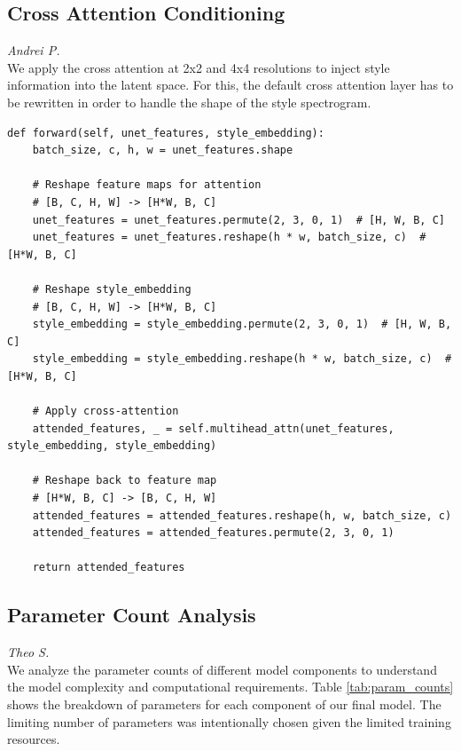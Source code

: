 \subsection{Cross Attention Conditioning}
\textit{Andrei P.}\\
We apply the cross attention at 2x2 and 4x4 resolutions to inject style information into the latent space. For this, the default cross attention layer has to be rewritten in order to handle the shape of the style spectrogram.
\begin{lstlisting}[basicstyle=\tiny]
def forward(self, unet_features, style_embedding):
    batch_size, c, h, w = unet_features.shape

    # Reshape feature maps for attention
    # [B, C, H, W] -> [H*W, B, C]
    unet_features = unet_features.permute(2, 3, 0, 1)  # [H, W, B, C]
    unet_features = unet_features.reshape(h * w, batch_size, c)  # [H*W, B, C]
    
    # Reshape style_embedding
    # [B, C, H, W] -> [H*W, B, C]
    style_embedding = style_embedding.permute(2, 3, 0, 1)  # [H, W, B, C]
    style_embedding = style_embedding.reshape(h * w, batch_size, c)  # [H*W, B, C]

    # Apply cross-attention
    attended_features, _ = self.multihead_attn(unet_features, style_embedding, style_embedding)
    
    # Reshape back to feature map
    # [H*W, B, C] -> [B, C, H, W]
    attended_features = attended_features.reshape(h, w, batch_size, c)
    attended_features = attended_features.permute(2, 3, 0, 1)
    
    return attended_features
\end{lstlisting}

\subsection{Parameter Count Analysis}
\textit{Theo S.}\\
We analyze the parameter counts of different model components to understand the model complexity and computational requirements. Table \ref{tab:param_counts} shows the breakdown of parameters for each component of our final model. The limiting number of parameters was intentionally chosen given the limited training resources.

